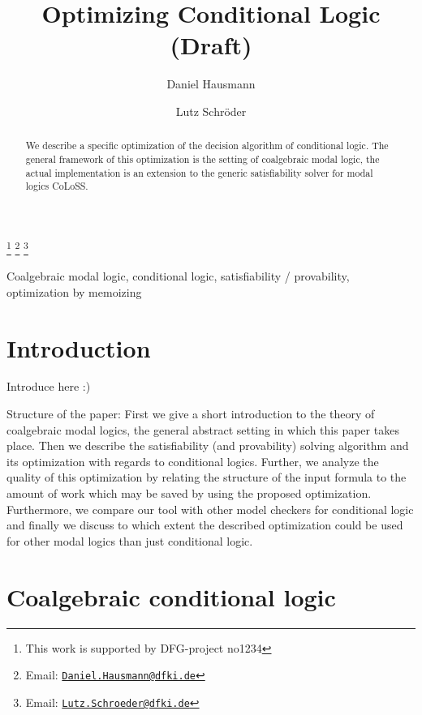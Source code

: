 \documentclass{entcs} \usepackage{entcsmacro}
\begin{document}
\begin{frontmatter}
  \title{Optimizing Conditional Logic (Draft)}
  \author[Bremen]{Daniel Hausmann}
  \author[Bremen]{Lutz Schr\"oder}
  \address[Bremen]{Deutsches Zentrum f\"ur k\"unstliche Intelligenz (DFKI)\\ Universit\"at Bremen, Germany}
  \thanks[ALL]{This work is supported by DFG-project no1234}
  \thanks[myemail]{Email: \href{mailto:Daniel.Hausmann@dfki.de} {\texttt{\normalshape Daniel.Hausmann@dfki.de}}}
  \thanks[coemail]{Email: \href{mailto:Lutz.Schroeder@dfki.de} {\texttt{\normalshape Lutz.Schroeder@dfki.de}}}
\begin{abstract} 
  We describe a specific optimization of the decision algorithm
of conditional logic. The general framework
  of this optimization is the setting of coalgebraic modal logic,
the actual implementation is an extension to
  the generic satisfiability solver for modal logics CoLoSS.
\end{abstract}
\begin{keyword}
  Coalgebraic modal logic, conditional logic,
satisfiability / provability, optimization by memoizing
\end{keyword}
\end{frontmatter}
\section{Introduction}\label{intro}

Introduce here :)

Structure of the paper: First we give a short introduction to
the theory of coalgebraic modal logics, the general abstract
setting in which this paper takes place. Then we describe the
satisfiability (and provability) solving algorithm and its
optimization with regards to conditional logics. Further, we 
analyze the quality of this optimization by relating
the structure of the input formula to the amount of work which may
be saved by using the proposed optimization. Furthermore,
we compare our tool with other model checkers for conditional logic
and finally we discuss to which extent the described
optimization could be used for other modal logics than just
conditional logic.
 
\section{Coalgebraic conditional logic}
\end{document}
